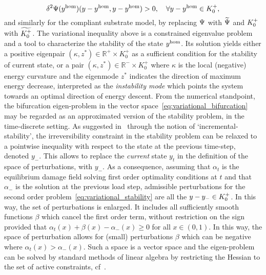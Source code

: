 \begin{equation}
     \label{eq:variational_stability}
     \delta^2 \Psi(y^{\text{hom}})(y - y^{\text{hom}},  y - y^{\text{hom}})  > 0, \quad \forall y-y^{\text{hom}} \in K^+_{0},
 \end{equation}
and similarly for the compliant substrate model, by replacing $\Psi$ with $\widetilde\Psi$ and $K^+_{0}$ with $\widetilde{K^+_{0}}$.
The variational inequality above is a constrained eigenvalue problem and a tool to characterize the stability of the state $y^{\text{hom}}$. Its solution yields either a positive eigenpair $(\kappa, z^*)\in \mathbb{R}^+\times K^+_0$ as a sufficient condition for the stability of current state, or a pair $(\kappa, z^*)\in \mathbb{R}^-\times K^+_0$ where $\kappa$ is the local (negative) energy curvature and the eigenmode $z^*$ indicates the direction of maximum energy decrease, interpreted as the \emph{instability mode} which points the system towards an optimal direction of energy descent. 
From the numerical standpoint, the bifurcation eigen-problem in the vector space~\eqref{eq:variational_bifurcation} may be regarded as an approximated version of the stability problem, in the time-discrete setting. As suggested in~\cite{Baldelli2021-gc} through the notion of `incremental-stability', the irreversibility constraint in the stability problem can be relaxed to a pointwise inequality with respect to the state at the previous time-step, denoted $y_-$.
This allows to replace the \emph{current} state $y_t$ in the definition of the space of perturbations, with $y_-$. As a consequence, assuming that $\alpha_t$ is the equilibrium damage field solving first order optimality conditions at $t$ and that $\alpha_-$ is the solution at the previous load step, admissible perturbations for the second order problem~\eqref{eq:variational_stability} are all the $y-y_-\in K^+_{0}$. In this way, the set of perturbations is enlarged. It includes all sufficiently smooth functions $\beta$ which cancel the first order term, without restriction on the sign provided that $\alpha_t(x) + \beta(x) - \alpha_-(x)\geq 0$ for all $x\in (0, 1)$.
% 
In this way, the space of perturbation allows for (small) perturbations $\beta$ which can be negative where $\alpha_t(x)>\alpha_-(x)$. Such a space is a vector space and the eigen-problem can be solved by standard methods of linear algebra by restricting the Hessian to the set of active constraints, cf~\cite{Nocedal1999-zr}.
